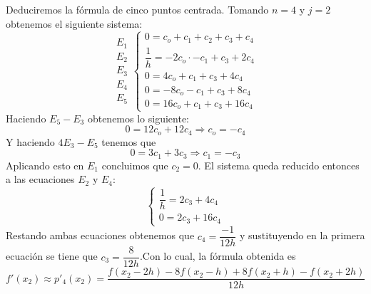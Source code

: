         \begin{ejem}
    Deduciremos la fórmula de cinco puntos centrada. Tomando $n=4$ y $j=2$ obtenemos el siguiente sistema:
    $$\begin{array}{r}
               E_1   \\
            E_2\\
            E_3\\
            E_4 \\
            E_5
            \end{array}
     \left\{\begin{array}{l}
                0=c_o+c_1+c_2+c_3+c_4   \\
                \dfrac{1}{h}=-2c_o\cdot-c_1+c_3+2c_4\\
                0=4c_o+c_1+c_3+4c_4\\
                0=-8c_o-c_1+c_3+8c_4\\
                0=16c_o+c_1+c_3+16c_4
            \end{array}\right.$$
    Haciendo $E_5-E_3$ obtenemos lo siguiente:
    $$0=12c_o+12c_4\Longrightarrow c_o=-c_4$$
    Y haciendo $4E_3-E_5$ tenemos que
    $$0=3c_1+3c_3\Longrightarrow c_1=-c_3$$
    Aplicando esto en $E_1$ concluimos que $c_2=0$. El sistema queda reducido entonces a las ecuaciones $E_2$ y $E_4$:
    $$\left\{\begin{array}{l}
         \dfrac{1}{h}=2c_3+ 4c_4\\
         0=2c_3+16c_4
    \end{array}\right.$$
    Restando ambas ecuaciones obtenemos que $c_4=\dfrac{-1}{12h}$ y sustituyendo en la primera ecuación se tiene que $c_3=\dfrac{8}{12h}$.Con lo cual, la fórmula obtenida es
    $$f'(x_2)\approx p'_4(x_2)=\dfrac{f(x_2-2h)-8f(x_2-h)+8f(x_2+h)-f(x_2+2h)}{12h}$$
    
        \end{ejem}
       
